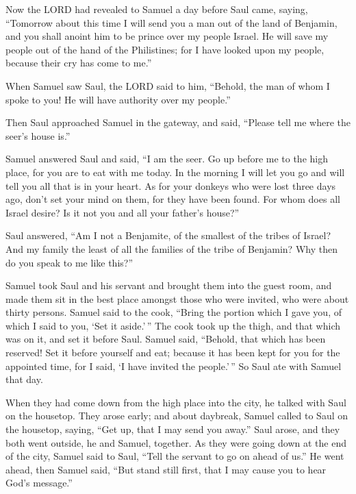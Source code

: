  Now the LORD had revealed to Samuel a day before Saul
came, saying,  ``Tomorrow about this time I will send you a
man out of the land of Benjamin, and you shall anoint him to be prince
over my people Israel. He will save my people out of the hand of the
Philistines; for I have looked upon my people, because their cry has
come to me.''

 When Samuel saw Saul, the LORD said to him, ``Behold, the
man of whom I spoke to you! He will have authority over my people.''

 Then Saul approached Samuel in the gateway, and said,
``Please tell me where the seer's house is.''

 Samuel answered Saul and said, ``I am the seer. Go up
before me to the high place, for you are to eat with me today. In the
morning I will let you go and will tell you all that is in your heart.
 As for your donkeys who were lost three days ago, don't
set your mind on them, for they have been found. For whom does all
Israel desire? Is it not you and all your father's house?''

 Saul answered, ``Am I not a Benjamite, of the smallest of
the tribes of Israel? And my family the least of all the families of the
tribe of Benjamin? Why then do you speak to me like this?''

 Samuel took Saul and his servant and brought them into the
guest room, and made them sit in the best place amongst those who were
invited, who were about thirty persons.  Samuel said to the
cook, ``Bring the portion which I gave you, of which I said to you, `Set
it aside.'\,''  The cook took up the thigh, and that which
was on it, and set it before Saul. Samuel said, ``Behold, that which has
been reserved! Set it before yourself and eat; because it has been kept
for you for the appointed time, for I said, `I have invited the
people.'\,'' So Saul ate with Samuel that day.

 When they had come down from the high place into the city,
he talked with Saul on the housetop.  They arose early; and
about daybreak, Samuel called to Saul on the housetop, saying, ``Get up,
that I may send you away.'' Saul arose, and they both went outside, he
and Samuel, together.  As they were going down at the end
of the city, Samuel said to Saul, ``Tell the servant to go on ahead of
us.'' He went ahead, then Samuel said, ``But stand still first, that I
may cause you to hear God's message.''

